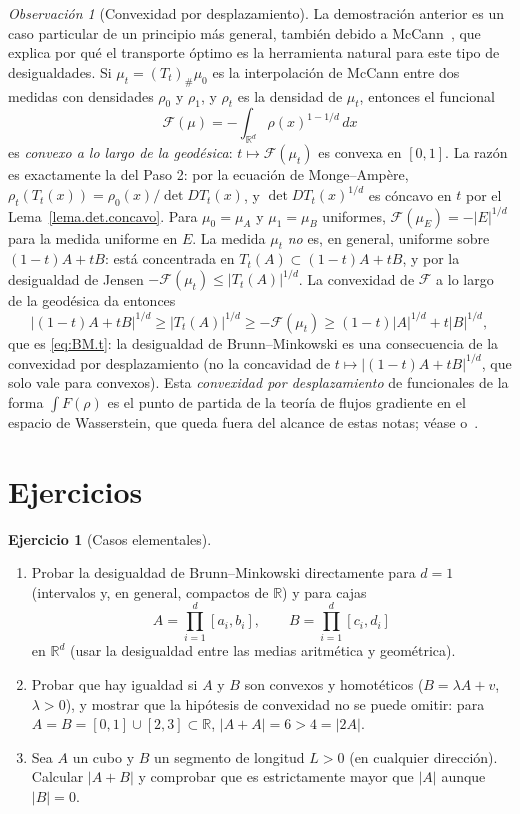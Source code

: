\documentclass[12pt, a4paper]{amsbook}
\newcommand{\R}{{\mathbb R}}
\theoremstyle{remark}
\newtheorem{obs}[teo]{Observación}
\theoremstyle{definition}
\newtheorem{ejercicio}{Ejercicio}[chapter]
\numberwithin{section}{chapter}
\numberwithin{subsection}{section}
\numberwithin{equation}{section}
\numberwithin{figure}{chapter}
\begin{document}
\begin{obs}[Convexidad por desplazamiento]\label{obs.desplazamiento.convexo}
La demostración anterior es un caso particular de un principio más general,
también debido a McCann~\cite{McCann1997}, que explica por qué el transporte
óptimo es la herramienta natural para este tipo de desigualdades. Si
$\mu_t=(T_t)_\#\mu_0$ es la interpolación de McCann entre dos medidas con
densidades $\rho_0$ y $\rho_1$, y $\rho_t$ es la densidad de $\mu_t$, entonces
el funcional
\[
\mathcal F(\mu)=-\int_{\R^d}\rho(x)^{1-1/d}\,dx
\]
es \emph{convexo a lo largo de la geodésica}: $t\mapsto\mathcal F(\mu_t)$ es
convexa en $[0,1]$. La razón es exactamente la del Paso 2: por la ecuación de
Monge--Ampère, $\rho_t(T_t(x))=\rho_0(x)/\det DT_t(x)$, y
$\det DT_t(x)^{1/d}$ es cóncavo en $t$ por el Lema~\ref{lema.det.concavo}.
Para $\mu_0=\mu_A$ y $\mu_1=\mu_B$ uniformes, $\mathcal F(\mu_E)=-|E|^{1/d}$
para la medida uniforme en $E$. La medida $\mu_t$ \emph{no} es, en general,
uniforme sobre $(1-t)A+tB$: está concentrada en $T_t(A)\subset(1-t)A+tB$, y
por la desigualdad de Jensen $-\mathcal F(\mu_t)\le|T_t(A)|^{1/d}$. La
convexidad de $\mathcal F$ a lo largo de la geodésica da entonces
\[
|(1-t)A+tB|^{1/d}\ge|T_t(A)|^{1/d}\ge-\mathcal F(\mu_t)
\ge(1-t)|A|^{1/d}+t|B|^{1/d},
\]
que es \eqref{eq:BM.t}: la desigualdad de Brunn--Minkowski es una
consecuencia de la convexidad por desplazamiento (no la concavidad de
$t\mapsto|(1-t)A+tB|^{1/d}$, que solo vale para convexos). Esta
\emph{convexidad por desplazamiento} de funcionales de la forma
$\int F(\rho)$ es el punto de partida de la teoría de flujos gradiente en el
espacio de Wasserstein, que queda fuera del alcance de estas notas; véase
\cite[Chapter~9]{AGS2008} o~\cite[Chapter~7]{Santambrogio}.
\end{obs}


\section*{Ejercicios}

\begin{ejercicio}[Casos elementales]\label{ejer.BM.elementales}
\leavevmode
\begin{enumerate}[label=(\alph*)]
\item Probar la desigualdad de Brunn--Minkowski directamente para $d=1$
(intervalos y, en general, compactos de $\R$) y para cajas
\[
A=\prod_{i=1}^d[a_i,b_i],\qquad B=\prod_{i=1}^d[c_i,d_i]
\]
en $\R^d$ (usar la desigualdad entre las medias aritmética y geométrica).
\item Probar que hay igualdad si $A$ y $B$ son convexos y homotéticos
($B=\lambda A+v$, $\lambda>0$), y mostrar que la hipótesis de convexidad no
se puede omitir: para $A=B=[0,1]\cup[2,3]\subset\R$, $|A+A|=6>4=|2A|$.
\item Sea $A$ un cubo y $B$ un segmento de longitud $L>0$ (en cualquier
dirección).
Calcular $|A+B|$ y comprobar que es estrictamente mayor que $|A|$ aunque
$|B|=0$.
\end{enumerate}
\end{ejercicio}
\end{document}
